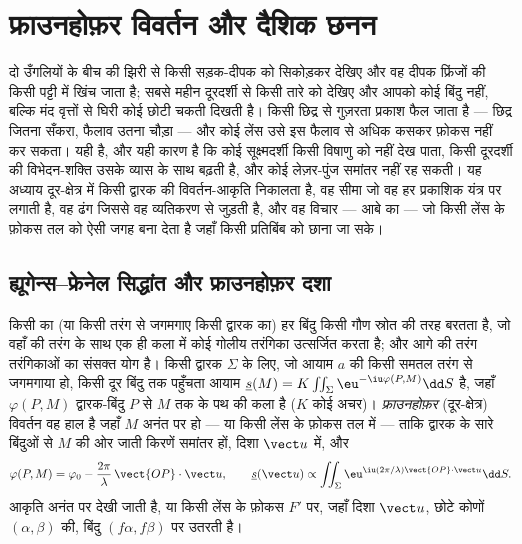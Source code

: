 \chapter{फ्राउनहोफ़र विवर्तन और दैशिक छनन}\label{ch:b2:diffraction}

दो उँगलियों के बीच की झिरी से किसी सड़क-दीपक को सिकोड़कर देखिए और वह
दीपक फ्रिंजों की किसी पट्टी में खिंच जाता है; सबसे महीन दूरदर्शी से किसी
तारे को देखिए और आपको कोई बिंदु नहीं, बल्कि मंद वृत्तों से घिरी कोई छोटी
चकती दिखती है। किसी छिद्र से गुज़रता प्रकाश फैल जाता है --- छिद्र जितना
सँकरा, फैलाव उतना चौड़ा --- और कोई लेंस उसे इस फैलाव से अधिक कसकर फ़ोकस नहीं
कर सकता। यही \emph{} है, और यही कारण है कि कोई सूक्ष्मदर्शी किसी
विषाणु को नहीं देख पाता, किसी दूरदर्शी की विभेदन-शक्ति उसके व्यास के साथ
बढ़ती है, और कोई लेज़र-पुंज समांतर नहीं रह सकती। यह अध्याय दूर-क्षेत्र में
किसी द्वारक की विवर्तन-आकृति निकालता है, वह सीमा जो वह हर प्रकाशिक यंत्र
पर लगाती है, वह ढंग जिससे वह व्यतिकरण से जुड़ती है, और वह विचार --- आबे का
--- जो किसी लेंस के फ़ोकस तल को ऐसी जगह बना देता है जहाँ किसी प्रतिबिंब को
छाना जा सके।

\section{ह्यूगेन्स--फ्रेनेल सिद्धांत और फ्राउनहोफ़र दशा}

\begin{definition}[ह्यूगेन्स--फ्रेनेल सिद्धांत]\label{def:b2:diffraction:huygens}
किसी  का (या किसी तरंग से जगमगाए किसी द्वारक का) हर बिंदु किसी
गौण स्रोत की तरह बरतता है, जो वहाँ की तरंग के साथ एक ही कला में कोई गोलीय
तरंगिका उत्सर्जित करता है; और आगे की तरंग तरंगिकाओं का संसक्त योग है। किसी
द्वारक $\Sigma$ के लिए, जो आयाम $a$ की किसी समतल तरंग से जगमगाया हो, किसी दूर बिंदु तक
पहुँचता आयाम $\underline s(M) = K\iint_\Sigma\eu^{-\iu\varphi(P, M)}\dd S$ है, जहाँ
$\varphi(P, M)$ द्वारक-बिंदु $P$ से $M$ तक के पथ की कला है
($K$ कोई अचर)। \emph{फ्राउनहोफ़र} (दूर-क्षेत्र) विवर्तन वह हाल है
जहाँ $M$ अनंत पर हो --- या किसी लेंस के फ़ोकस तल में --- ताकि
द्वारक के सारे बिंदुओं से $M$ की ओर जाती किरणें समांतर हों,
दिशा $\vect u$ में, और
\[
\varphi(P, M) = \varphi_0 - \frac{2\pi}\lambda\,\vect{OP}\cdot\vect u , \qquad
\underline s(\vect u) \propto \iint_\Sigma\eu^{\iu(2\pi/\lambda)\vect{OP}\cdot\vect u}\dd S .
\]
आकृति अनंत पर देखी जाती है, या किसी लेंस के फ़ोकस $F'$ पर,
जहाँ दिशा $\vect u$, छोटे कोणों $(\alpha, \beta)$ की, बिंदु
$(f\alpha, f\beta)$ पर उतरती है।
\end{definition}
\admitted

